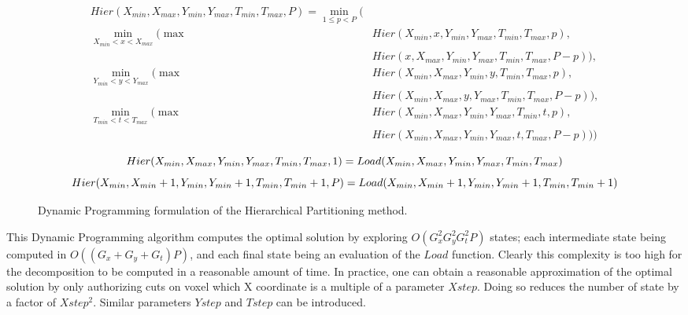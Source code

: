 \documentclass[10pt, conference, compsocconf]{IEEEtran}
\begin{document}
\begin{figure}
  \begin{equation}
    \begin{split}
  Hier(X_{min}, X_{max}, Y_{min}, Y_{max}, T_{min}, T_{max}, P) = \min_{1 \leq p <P} (\\
\min_{X_{min}<x<X_{max}}  ( \max& Hier(X_{min}, x, Y_{min}, Y_{max}, T_{min}, T_{max}, p),\\
                         & Hier(x, X_{max}, Y_{min}, Y_{max}, T_{min}, T_{max}, P-p) ),\\
\min_{Y_{min}<y<Y_{max}}  ( \max & Hier(X_{min}, X_{max}, Y_{min}, y, T_{min}, T_{max}, p),\\
                          & Hier(X_{min}, X_{max}, y, Y_{max}, T_{min}, T_{max}, P-p) ),\\
\min_{T_{min}<t<T_{max}}  ( \max &Hier(X_{min}, X_{max}, Y_{min}, Y_{max}, T_{min}, t, p),\\
                    & Hier(X_{min}, X_{max}, Y_{min}, Y_{max}, t, T_{max}, P-p) ) )\\
    \end{split}
\end{equation}
\begin{equation}
Hier(X_{min}, X_{max}, Y_{min}, Y_{max}, T_{min}, T_{max}, 1 ) =\\
Load(X_{min}, X_{max}, Y_{min}, Y_{max}, T_{min}, T_{max})
\end{equation}
\begin{equation}
Hier(X_{min}, X_{min}+1, Y_{min}, Y_{min}+1, T_{min}, T_{min}+1, P ) =\\
Load(X_{min}, X_{min}+1, Y_{min}, Y_{min}+1, T_{min}, T_{min}+1)
\end{equation}

\caption{Dynamic Programming formulation of the Hierarchical Partitioning method.}

\label{fig:hier-dp}
\end{figure}

This Dynamic Programming algorithm computes the optimal solution by
exploring $O(G_x^2 G_y^2 G_t^2 P)$ states; each intermediate state
being computed in $O((G_x +G_y+G_t) P )$, and each final state being
an evaluation of the $Load$ function. Clearly this complexity is too
high for the decomposition to be computed in a reasonable amount of
time. In practice, one can obtain a reasonable approximation of the
optimal solution by only authorizing cuts on voxel which X coordinate
is a multiple of a parameter $Xstep$. Doing so reduces the number of
state by a factor of $Xstep^2$. Similar parameters $Ystep$ and $Tstep$
can be introduced.
\end{document}
